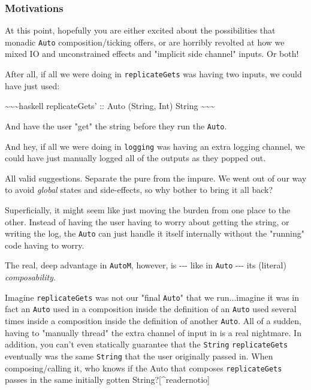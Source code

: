 \documentclass[]{article}
\begin{document}
\subsubsection{Motivations}

At this point, hopefully you are either excited about the possibilities that
monadic \texttt{Auto} composition/ticking offers, or are horribly revolted at
how we mixed IO and unconstrained effects and "implicit side channel" inputs. Or
both!

After all, if all we were doing in \texttt{replicateGets} was having two inputs,
we could have just used:

\textasciitilde{}\textasciitilde{}\textasciitilde{}haskell replicateGets' ::
Auto (String, Int) String \textasciitilde{}\textasciitilde{}\textasciitilde{}

And have the user "get" the string before they run the \texttt{Auto}.

And hey, if all we were doing in \texttt{logging} was having an extra logging
channel, we could have just manually logged all of the outputs as they popped
out.

All valid suggestions. Separate the pure from the impure. We went out of our way
to avoid \emph{global} states and side-effects, so why bother to bring it all
back?

Superficially, it might seem like just moving the burden from one place to the
other. Instead of having the user having to worry about getting the string, or
writing the log, the \texttt{Auto} can just handle it itself internally without
the "running" code having to worry.

The real, deep advantage in \texttt{AutoM}, however, is -\/-\/- like in
\texttt{Auto} -\/-\/- its (literal) \emph{composability}.

Imagine \texttt{replicateGets\textquotesingle{}} was not our "final
\texttt{Auto}" that we run...imagine it was in fact an \texttt{Auto} used in a
composition inside the definition of an \texttt{Auto} used several times inside
a composition inside the definition of another \texttt{Auto}. All of a sudden,
having to "manually thread" the extra channel of input in is a real nightmare.
In addition, you can't even statically guarantee that the \texttt{String}
\texttt{replicateGets} eventually was the same \texttt{String} that the user
originally passed in. When composing/calling it, who knows if the Auto that
composes \texttt{replicateGets\textquotesingle{}} passes in the same initially
gotten String?{[}\^{}readernotio{]}
\end{document}
